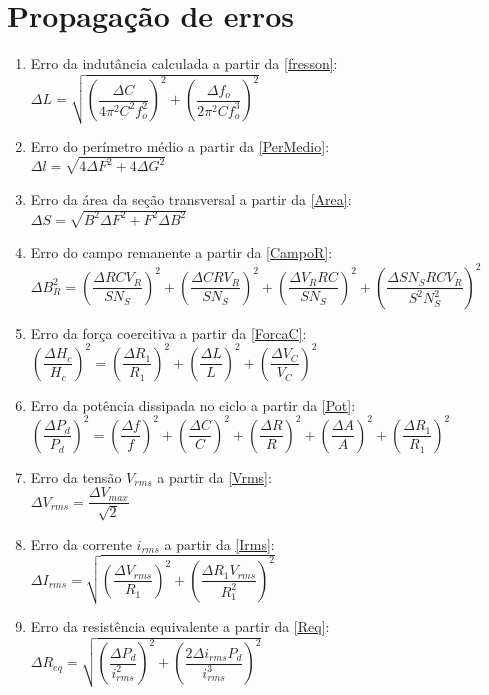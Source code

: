 \documentclass[11pt,a4paper]{article}
\begin{document}
\section{Propagação de erros \label{ap:erros}}
    \begin{enumerate}
        \item Erro da indutância calculada a partir da \cref{fresson}:\\
            $\Delta L = \sqrt{ \left (\dfrac{\Delta C}{4 \pi ^2 C^2 f_o^2} \right ) ^2+\left ( \dfrac{\Delta f_o}{2 \pi ^2 C f^3_o} \right ) ^2}$
        \item Erro do perímetro médio a partir da \cref{PerMedio}:\\
            $\Delta l = \sqrt{4\Delta F^2 + 4\Delta G^2}$
        \item Erro da área da seção transversal a partir da \cref{Area}:\\
            $\Delta S = \sqrt{B^2 \Delta F^2 + F^2 \Delta B^2}$
        \item Erro do campo remanente a partir da \cref{CampoR}:\\
            ${\Delta B_R^2} = {\left(\dfrac{\Delta R C V_R}{S N_S}\right)^2} + {\left(\dfrac{\Delta C R V_R}{S N_S}\right)^2} + {\left(\dfrac{\Delta V_R R C}{S N_S}\right)^2} + {\left(\dfrac{\Delta S N_S R C V_R}{S^2 N_S^2}\right)^2}$
        \item Erro da força coercitiva a partir da \cref{ForcaC}:\\
            ${\left(\dfrac{\Delta H_c}{ H_c}\right)^2} = {\left(\dfrac{\Delta R_1}{ R_1}\right)^2} + {\left(\dfrac{\Delta L }{ L}\right)^2} + {\left(\dfrac{\Delta V_C}{ V_C}\right)^2}$
        \item Erro da potência dissipada no ciclo a partir da \cref{Pot}:\\
            ${\left(\dfrac{\Delta P_d}{P_d}\right)^2} = {\left(\dfrac{\Delta f}{f}\right)^2} + {\left(\dfrac{\Delta C}{C}\right)^2} + {\left(\dfrac{\Delta R}{R}\right)^2} + {\left(\dfrac{\Delta A}{A}\right)^2} + {\left(\dfrac{\Delta R_1}{R_1}\right)^2}$
        \item Erro da tensão $V_{rms}$ a partir da \cref{Vrms}:\\
            $\Delta V_{rms} = \dfrac{\Delta V_{max}}{\sqrt{2}}$
        \item Erro da corrente $i_{rms}$ a partir da \cref{Irms}:\\
            $\Delta I_{rms} = \sqrt{{\left(\dfrac{\Delta V_{rms}}{R_1}\right)^2} + {\left(\dfrac{\Delta R_1 V_{rms}}{R_1^2}\right)^2}}$
        \item Erro da resistência equivalente a partir da \cref{Req}:\\
            $\Delta R_{eq} = \sqrt{{\left(\dfrac{\Delta P_d}{i_{rms}^2}\right)^2} + {\left(\dfrac{2 \Delta i_{rms} P_d}{i_{rms}^3}\right)^2}}$
            
    \end{enumerate}
\end{document}
